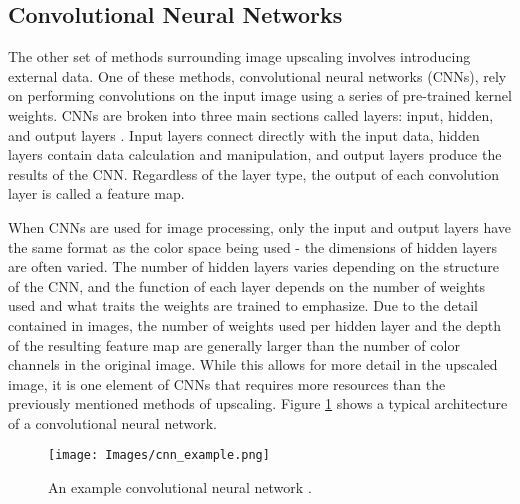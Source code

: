 \documentclass{article}
\begin{document}
    \subsection{Convolutional Neural Networks}
    \noindent The other set of methods surrounding image upscaling involves introducing external data. One of these methods, convolutional neural networks (CNNs), rely on performing convolutions on the input image using a series of pre-trained kernel weights. CNNs are broken into three main sections called layers: input, hidden, and output layers \cite{pendhari_connected_2024}. Input layers connect directly with the input data, hidden layers contain data calculation and manipulation, and output layers produce the results of the CNN. Regardless of the layer type, the output of each convolution layer is called a feature map.
    \par When CNNs are used for image processing, only the input and output layers have the same format as the color space being used - the dimensions of hidden layers are often varied. The number of hidden layers varies depending on the structure of the CNN, and the function of each layer depends on the number of weights used and what traits the weights are trained to emphasize. Due to the detail contained in images, the number of weights used per hidden layer and the depth of the resulting feature map are generally larger than the number of color channels in the original image. While this allows for more detail in the upscaled image, it is one element of CNNs that requires more resources than the previously mentioned methods of upscaling. Figure \ref{fig:cnn_example} shows a typical architecture of a convolutional neural network.

    \begin{figure}[!tb] 
        \centering
        \texttt{[image: Images/cnn\_example.png]} 
        \caption{An example convolutional neural network \cite{ratan_what_2020}.} 
        \label{fig:cnn_example} 
    \end{figure}
\end{document}

